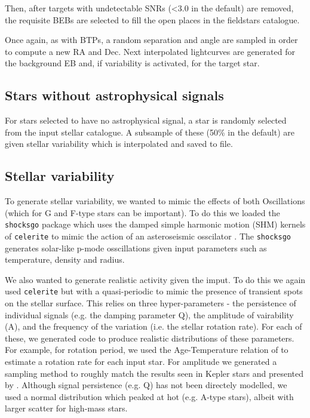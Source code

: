 \documentclass{article}
\begin{document}
Then, after targets with undetectable SNRs (<3.0 in the default) are removed, the requisite BEBs are selected to fill the open places in the fieldstars catalogue.

Once again, as with BTPs, a random separation and angle are sampled in order to compute a new RA and Dec.
Next interpolated lightcurves are generated for the background EB and, if variability is activated, for the target star.

\subsection{Stars without astrophysical signals}
For stars selected to have no astrophysical signal, a star is randomly selected from the input stellar catalogue.
A subsample of these (50\% in the default) are given stellar variability which is interpolated and saved to file.

\subsection{Stellar variability}\label{var}
To generate stellar variability, we wanted to mimic the effects of both Oscillations (which for G and F-type stars can be important).
To do this we loaded the \texttt{shocksgo} package which uses the damped simple harmonic motion (SHM) kernels of \texttt{celerite} to mimic the action of an asteroseismic osscilator \citep{foreman2018scalable}.
The \texttt{shocksgo} generates solar-like p-mode osscillations given input parameters such as temperature, density and radius. 

We also wanted to generate realistic activity given the imput. To do this we again used \texttt{celerite} but with a quasi-periodic to mimic the presence of transient spots on the stellar surface. This relies on three hyper-parameters - the persistence of individual signals (e.g. the damping parameter Q), the amplitude of vairability (A), and the frequency of the variation (i.e. the stellar rotation rate).
For each of these, we generated code to produce realistic distributions of these parameters. For example, for rotation period, we used the Age-Temperature relation of \citet{angus} to estimate a rotation rate for each input star.
For amplitude we generated a sampling method to roughly match the results seen in Kepler stars and presented by \citet{mcquillan2014rotation}. 
Although signal persistence (e.g. Q) has not been directely modelled, we used a normal distribution which peaked at  hot (e.g. A-type stars), albeit with larger scatter for high-mass stars.
\end{document}
